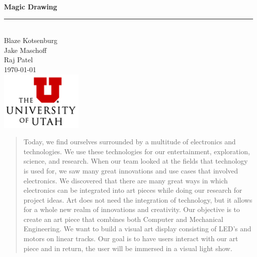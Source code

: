 \documentclass[12pt]{article}
\begin{document}
\begin{titlepage}

  \newcommand{\HRule}{\rule{\linewidth}{0.5mm}} %
  
  \vspace*{\fill}
  \center %
  
  { \huge \bfseries Magic Drawing}\\
  \HRule \\[1cm]

  \large Blaze Kotsenburg\\
  \large Jake Maschoff\\
  \large Raj Patel\\[1cm]
  
  \normalsize \today\\[4cm]
  
  \includegraphics[width=0.30\textwidth]{logo.png}
  \vspace*{\fill}
  
\end{titlepage}

\tableofcontents
\noindent\hrulefill

\begin{abstract}
  
  Today, we find ourselves surrounded by a multitude of electronics and technologies. We use these technologies for our entertainment, exploration, science, and research. When our team looked at the fields that technology is used for, we saw many great innovations and use cases that involved electronics. We discovered that there are many great ways in which electronics can be integrated into art pieces while doing our research for project ideas. Art does not need the integration of technology, but it allows for a whole new realm of innovations and creativity. Our objective is to create an art piece that combines both Computer and Mechanical Engineering. We want to build a visual art display consisting of LED’s and motors on linear tracks. Our goal is to have users interact with our art piece and in return, the user will be immersed in a visual light show.
\end{abstract}
\end{document}
